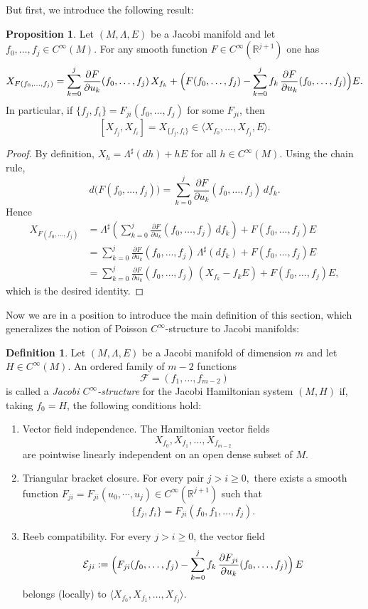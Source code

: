 \documentclass{article}
\theoremstyle{remark}
\theoremstyle{definition}
\newtheorem{proposition}{Proposition}[section]
\newtheorem{definition}{Definition}[section]
\begin{document}
But first, we introduce the following result:


\begin{proposition}\label{JacC}
Let $(M,\Lambda,E)$ be a Jacobi manifold and let $f_0,\dots,f_j\in C^\infty(M)$. For any smooth function $F\in C^\infty(\mathbb{R}^{j+1})$ one has
\[
X_{F(f_0,\dots,f_j)}
=\sum_{k=0}^j \frac{\partial F}{\partial u_k}(f_0,\dots,f_j)\,X_{f_k}
+\Bigl(F(f_0,\dots,f_j)-\sum_{k=0}^j f_k\,\frac{\partial F}{\partial u_k}(f_0,\dots,f_j)\Bigr)E.
\]
In particular, if $\{f_j,f_i\}=F_{ji}(f_0,\dots,f_j)$ for some $F_{ji}$, then
\[
[X_{f_j},X_{f_i}]=X_{\{f_j,f_i\}}\in \langle X_{f_0},\dots,X_{f_j},E\rangle.
\]
\end{proposition}
\begin{proof}
By definition, $X_h=\Lambda^\sharp(dh)+hE$ for all $h\in C^\infty(M)$. Using the chain rule,
\[
d\bigl(F(f_0,\dots,f_j)\bigr)=\sum_{k=0}^j \frac{\partial F}{\partial u_k}(f_0,\dots,f_j)\,df_k.
\]
Hence
\begin{align*}
X_{F(f_0,\dots,f_j)}
&=\Lambda^\sharp\!\left(\sum_{k=0}^j \frac{\partial F}{\partial u_k}(f_0,\dots,f_j)\,df_k\right)+F(f_0,\dots,f_j)E \\
&=\sum_{k=0}^j \frac{\partial F}{\partial u_k}(f_0,\dots,f_j)\,\Lambda^\sharp(df_k)+F(f_0,\dots,f_j)E \\
&=\sum_{k=0}^j \frac{\partial F}{\partial u_k}(f_0,\dots,f_j)\,(X_{f_k}-f_kE)+F(f_0,\dots,f_j)E,
\end{align*}
which is the desired identity.
\end{proof}

Now we are in a position to introduce the main definition of this section, which generalizes the notion of Poisson $C^\infty$-structure to Jacobi manifolds:
\begin{definition}\label{jacobicinf}
Let $(M,\Lambda,E)$ be a Jacobi manifold of dimension $m$ and let $H\in C^\infty(M)$. An ordered family of $m-2$ functions
\[
\mathcal F=(f_1,\dots,f_{m-2})
\]
is called a \emph{Jacobi $C^\infty$-structure} for the Jacobi Hamiltonian system $(M,H)$ if, taking $f_0=H$, the following conditions hold:


{
\renewcommand{\labelenumi}{\textup{(\arabic{enumi})}}
\begin{enumerate}
\item \textup{Vector field independence.} The Hamiltonian vector fields
\[
X_{f_0},X_{f_1},\dots,X_{f_{m-2}}
\]
are pointwise linearly independent on an open dense subset of $M$.

\item \textup{Triangular bracket closure.} For every pair $j>i\geq 0,$ there exists a smooth function
\(
F_{ji}=F_{ji}(u_0,\cdots,u_j)\in C^\infty(\mathbb{R}^{j+1})
\)
such that
\[
\{f_j,f_i\}=F_{ji}(f_0,f_1,\dots,f_j).
\]

\item \textup{Reeb compatibility.} For every $j>i\geq 0$, the vector field 
\[
\mathcal E_{ji}:=\Bigl(F_{ji}(f_0,\dots,f_j)-\sum_{k=0}^j f_k\,\frac{\partial F_{ji}}{\partial u_k}(f_0,\dots,f_j)\Bigr)\,E
\]
belongs (locally) to $\langle X_{f_0},X_{f_1},\dots,X_{f_j}\rangle$.
\end{enumerate}
}
\end{definition}
\end{document}
